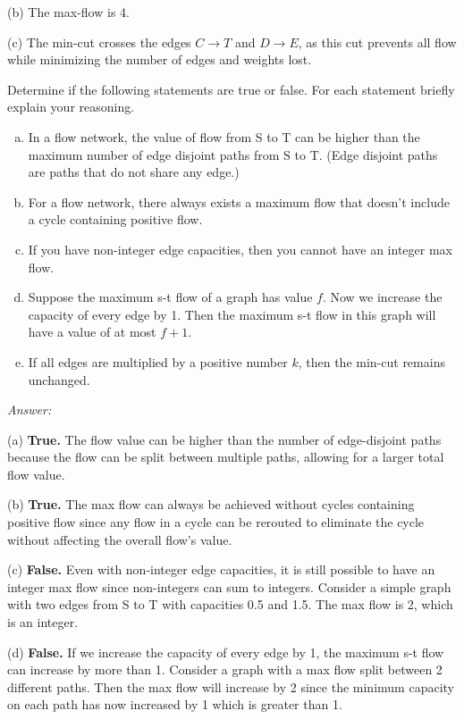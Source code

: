 \documentclass[12pt]{article}
\newenvironment{problem}[2][Problem]{\begin{trivlist}
\item[\hskip \labelsep {\bfseries #1}\hskip \labelsep {\bfseries #2.}]}{\end{trivlist}}
\begin{document}
(b) The max-flow is 4.

(c) The min-cut crosses the edges $C\rightarrow T$ and $D \rightarrow E$, as this cut prevents all flow while minimizing the number of edges and weights lost.

\begin{problem}{2}
    Determine if the following statements are true or false. For each statement briefly explain your reasoning.
    \begin{enumerate}[(a)]
    \item In a flow network, the value of flow from S to T can be higher than the maximum number of edge disjoint paths from S to T. (Edge disjoint paths are paths that do not share any edge.)
        \item For a flow network, there always exists a maximum flow that doesn't include a cycle containing positive flow.
        \item If you have non-integer edge capacities, then you cannot have an integer max flow.
        \item Suppose the maximum s-t flow of a graph has value $f$. Now we increase the capacity of every edge by 1. Then the maximum s-t flow in this graph will have a value of at most $f+1$.
        \item If all edges are multiplied by a positive number $k$, then the min-cut remains unchanged.
    \end{enumerate}
\end{problem}

\textit{Answer:}

(a) \textbf{True.} The flow value can be higher than the number of edge-disjoint paths because the flow can be split between multiple paths, allowing for a larger total flow value.

(b) \textbf{True.} The max flow can always be achieved without cycles containing positive flow since any flow in a cycle can be rerouted to eliminate the cycle without affecting the overall flow's value.

(c) \textbf{False.} Even with non-integer edge capacities, it is still possible to have an integer max flow since non-integers can sum to integers. Consider a simple graph with two edges from S to T with capacities 0.5 and 1.5. The max flow is 2, which is an integer. 

(d) \textbf{False.} If we increase the capacity of every edge by 1, the maximum s-t flow can increase by more than 1. Consider a graph with a max flow split between 2 different paths. Then the max flow will increase by 2 since the minimum capacity on each path has now increased by 1 which is greater than 1.
\end{document}
